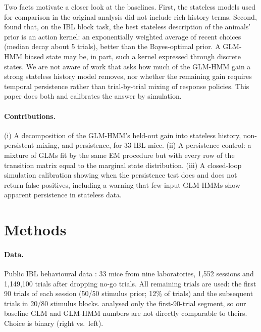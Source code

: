 \documentclass[11pt]{article}
\begin{document}
Two facts motivate a closer look at the baselines. First, the stateless models used for comparison in the original analysis did not include rich history terms. Second, \citet{findling2025} found that, on the IBL block task, the best stateless description of the animals' prior is an action kernel: an exponentially weighted average of recent choices (median decay about 5 trials), better than the Bayes-optimal prior. A GLM-HMM biased state may be, in part, such a kernel expressed through discrete states. We are not aware of work that asks how much of the GLM-HMM gain a strong stateless history model removes, nor whether the remaining gain requires temporal persistence rather than trial-by-trial mixing of response policies. This paper does both and calibrates the answer by simulation.

\paragraph{Contributions.} (i) A decomposition of the GLM-HMM's held-out gain into stateless history, non-persistent mixing, and persistence, for 33 IBL mice. (ii) A persistence control: a mixture of GLMs fit by the same EM procedure but with every row of the transition matrix equal to the marginal state distribution. (iii) A closed-loop simulation calibration showing when the persistence test does and does not return false positives, including a warning that few-input GLM-HMMs show apparent persistence in stateless data.

\section{Methods}
\paragraph{Data.} Public IBL behavioural data \citep{ibl2021}: 33 mice from nine laboratories, 1{,}552 sessions and 1{,}149{,}100 trials after dropping no-go trials. All remaining trials are used: the first 90 trials of each session (50/50 stimulus prior; 12\% of trials) and the subsequent trials in 20/80 stimulus blocks. \citet{ashwood2022} analysed only the first-90-trial segment, so our baseline GLM and GLM-HMM numbers are not directly comparable to theirs. Choice is binary (right vs.\ left).
\end{document}
